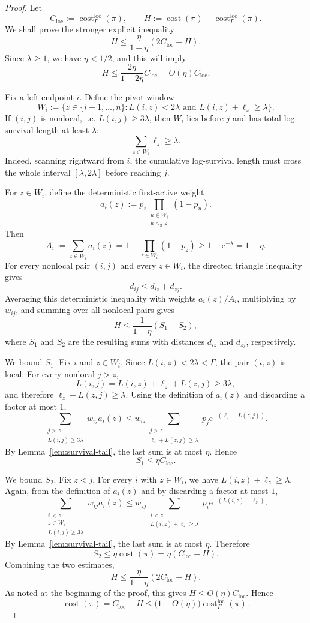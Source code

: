 \documentclass[11pt]{article}
\newcommand{\cost}{\operatorname{cost}}
\newcommand{\loc}{\operatorname{loc}}
\newcommand{\e}{\mathrm e}
\begin{document}
\begin{proof}
Let
\[
    C_{\loc}:=\cost^{\loc}_{\Gamma}(\pi),
    \qquad
    H:=\cost(\pi)-\cost^{\loc}_{\Gamma}(\pi).
\]
We shall prove the stronger explicit inequality
\[
    H\le \frac{\eta}{1-\eta}(2C_{\loc}+H).
\]
Since $\lambda\ge1$, we have $\eta<1/2$, and this will imply
\[
    H\le \frac{2\eta}{1-2\eta}C_{\loc}=O(\eta)C_{\loc}.
\]

Fix a left endpoint $i$.  Define the pivot window
\[
    W_i
    :=
    \{z\in\{i+1,\dots,n\}: L(i,z)<2\lambda
       \text{ and } L(i,z)+\ell_z\ge\lambda\}.
\]
If $(i,j)$ is nonlocal, i.e. $L(i,j)\ge3\lambda$, then $W_i$ lies before $j$ and
has total log-survival length at least $\lambda$:
\[
    \sum_{z\in W_i}\ell_z\ge\lambda.
\]
Indeed, scanning rightward from $i$, the cumulative log-survival length must
cross the whole interval $[\lambda,2\lambda]$ before reaching $j$.

For $z\in W_i$, define the deterministic first-active weight
\[
    a_i(z)
    :=
    p_z\prod_{\substack{u\in W_i\\ u<_\pi z}}(1-p_u).
\]
Then
\[
    A_i:=\sum_{z\in W_i}a_i(z)
    =1-\prod_{z\in W_i}(1-p_z)
    \ge 1-\e^{-\lambda}=1-\eta.
\]
For every nonlocal pair $(i,j)$ and every $z\in W_i$, the directed triangle
inequality gives
\[
    d_{ij}\le d_{iz}+d_{zj}.
\]
Averaging this deterministic inequality with weights $a_i(z)/A_i$, multiplying
by $w_{ij}$, and summing over all nonlocal pairs gives
\[
    H\le \frac{1}{1-\eta}(S_1+S_2),
\]
where $S_1$ and $S_2$ are the resulting sums with distances $d_{iz}$ and
$d_{zj}$, respectively.

We bound $S_1$.  Fix $i$ and $z\in W_i$.  Since $L(i,z)<2\lambda<\Gamma$, the
pair $(i,z)$ is local.  For every nonlocal $j>z$,
\[
    L(i,j)=L(i,z)+\ell_z+L(z,j)\ge3\lambda,
\]
and therefore $\ell_z+L(z,j)\ge\lambda$.  Using the definition of $a_i(z)$ and
discarding a factor at most $1$,
\[
    \sum_{\substack{j>z\\L(i,j)\ge3\lambda}}
    w_{ij}a_i(z)
    \le
    w_{iz}
    \sum_{\substack{j>z\\\ell_z+L(z,j)\ge\lambda}}
    p_j\e^{-(\ell_z+L(z,j))}.
\]
By Lemma~\ref{lem:survival-tail}, the last sum is at most $\eta$.  Hence
\[
    S_1\le \eta C_{\loc}.
\]

We bound $S_2$.  Fix $z<j$.  For every $i$ with $z\in W_i$, we have
$L(i,z)+\ell_z\ge\lambda$.  Again, from the definition of $a_i(z)$ and by
discarding a factor at most $1$,
\[
    \sum_{\substack{i<z\\ z\in W_i\\ L(i,j)\ge3\lambda}}
    w_{ij}a_i(z)
    \le
    w_{zj}
    \sum_{\substack{i<z\\L(i,z)+\ell_z\ge\lambda}}
    p_i\e^{-(L(i,z)+\ell_z)}.
\]
By Lemma~\ref{lem:survival-tail}, the last sum is at most $\eta$.  Therefore
\[
    S_2\le \eta\cost(\pi)=\eta(C_{\loc}+H).
\]
Combining the two estimates,
\[
    H\le \frac{\eta}{1-\eta}(2C_{\loc}+H).
\]
As noted at the beginning of the proof, this gives $H\le O(\eta)C_{\loc}$.
Hence
\[
    \cost(\pi)=C_{\loc}+H
    \le
    \bigl(1+O(\eta)\bigr)\cost^{\loc}_{\Gamma}(\pi).
\]
\end{proof}
\end{document}
